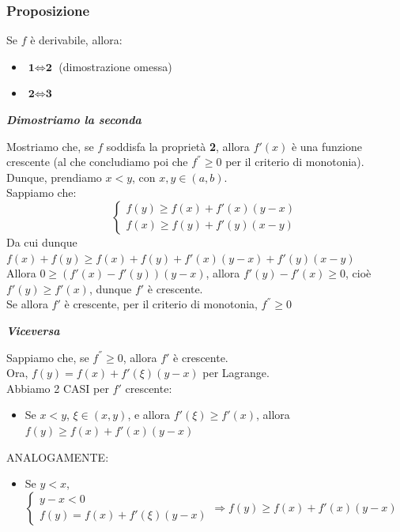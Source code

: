 \documentclass{article}
\theoremstyle{definition}
\begin{document}
\subsubsection{Proposizione}
Se $f$ è derivabile, allora:
\begin{itemize}
    \item $\textbf{1} \Longleftrightarrow \textbf{2}$ (dimostrazione omessa)
    \item $\textbf{2} \Longleftrightarrow \textbf{3}$
\end{itemize}
\begin{center}
    \textbf{\textit{Dimostriamo la seconda}}
\end{center}
Mostriamo che, se $f$ soddisfa la proprietà \textbf{2}, allora $f'(x)$ è una funzione crescente (al che concludiamo poi che $f^{''}\geqslant 0$ per il criterio di monotonia).
\\
Dunque,  prendiamo $x<y$, con $x,y \in (a,b)$.
\\
Sappiamo che:
\begin{equation}
\begin{cases}
    f(y) \geqslant f(x) + f'(x)(y-x) \\
    f(x) \geqslant f(y)+f'(y)(x-y)
\end{cases}
\end{equation}
Da cui dunque $f(x)+f(y) \geqslant f(x)+f(y)+f'(x)(y-x)+f'(y)(x-y)$ \\
Allora $0 \geqslant (f'(x)-f'(y))(y-x)$, allora $f'(y)-f'(x) \geqslant 0$, cioè $f'(y) \geqslant f'(x)$, dunque $f'$ è crescente.
\\
Se allora $f'$ è crescente, per il criterio di monotonia, $f^{''} \geqslant 0$
\newpage
\begin{center}
    \textbf{\textit{Viceversa}}
\end{center}
Sappiamo che, se $f^{''} \geqslant 0$, allora $f' $ è crescente.
\\
Ora, $f(y)=f(x)+f'(\xi)(y-x)$ per Lagrange.
\\
Abbiamo 2 CASI per $f'$ crescente:
\begin{itemize}
    \item Se $x<y$, $\xi \in (x,y)$, e allora $f'(\xi) \geqslant f'(x)$, allora $f(y) \geqslant f(x) + f'(x)(y-x)$
\end{itemize}
ANALOGAMENTE:
\begin{itemize}
\item Se $y<x$, $\begin{cases}
    y-x < 0 \\
    f(y)=f(x)+f'(\xi)(y-x)
\end{cases} \Longrightarrow f(y) \geqslant f(x)+f'(x)(y-x)$
\end{itemize}
\end{document}
